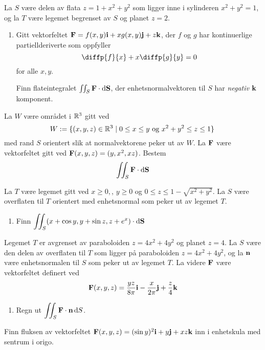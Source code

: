 \oppgave[K2015, Oppgave 7] La $S$ være delen av flata $z = 1 + x^2 + y^2$ som
ligger inne i sylinderen $x^2 + y^2 = 1$, og la $T$ være legemet begrenset av
$S$ og planet $z = 2$.

\begin{enumerate}
  \item Gitt vektorfeltet $\mathbf{F} = f(x,y) \mathbf{i} + x g(x,y) \mathbf{j} + z \mathbf{k}$, der $f$ og
    $g$ har kontinuerlige partiellderiverte som oppfyller
    \begin{equation*}
      \diffp{f}{x} + x \diffp{g}{y} = 0
    \end{equation*}
    for alle $x, y$.

    Finn flateintegralet $\iint_S \mathbf{F} \cdot \mathop{}\! \mathrm{d} \mathbf{S}\mathop{}\!$, der enhetsnormalvektoren
    til $S$ har \emph{negativ} $\mathbf{k}$ komponent.
\end{enumerate}

\oppgave[V2014, Oppgave 7] La $W$ være området i $\mathbb{R}^3$ gitt ved
%
\begin{equation*}
  W := \{ (x,y,z) \in \R^3 \mid 0 \leq x \leq y \ \text{og} \ x^2 + y^2 \leq z \leq 1 \}\,
\end{equation*}
%
med rand $S$ orientert slik at normalvektorene peker ut av $W$. La
$\mathbf{F}$ være vektorfeltet gitt ved $\mathbf{F}(x,y,z) = (y,x^2,xz)$. Bestem
%
\begin{equation*}
  \iint_{S} \mathbf{F} \cdot \mathop{}\! \mathrm{d} \mathbf{S}\mathop{}\!
\end{equation*}

\oppgave[K2013, Oppgave 7] La $T$ være legemet gitt ved $x \geq 0,$, $y \geq 0$
og $0 \leq z \leq 1 - \sqrt{x^2 + y^2}$. La $S$ være overflaten til $T$
orientert med enhetsnormal som peker ut av legemet $T$.

\begin{enumerate}
  \item Finn $\displaystyle \iint_S (x + \cos y, y + \sin z, z + e^x) \cdot \mathop{}\! \mathrm{d} \mathbf{S}\mathop{}\!$
\end{enumerate}

\oppgave[K2012, Oppgave 6] Legemet $T$ er avgrenset av paraboloiden $z = 4x^2 +
4y^2$ og planet $z = 4$. La $S$ være den delen av overflaten til $T$ som ligger
på paraboloiden $z = 4x^2 + 4y^2$, og la $\mathbf{n}$ være enhetsnormalen til $S$
som peker ut av legemet $T$. La videre $\mathbf{F}$ være vektorfeltet definert ved
%
\begin{equation*}
  \mathbf{F}(x,y,z)
  = \frac{yz}{8\pi} \mathbf{i} - \frac{x}{2\pi}\mathbf{j} + \frac{z}{4}\mathbf{k}
\end{equation*}
%
\begin{enumerate}
  \item Regn ut $\displaystyle \iint_S \mathbf{F} \cdot \mathbf{n} \mathop{}\! \mathrm{d} S\mathop{}\!$.
\end{enumerate}


\oppgave[V2012, Oppgave 5] Finn fluksen av vektorfeltet $\mathbf{F}(x,y,z) = (\sin
y)^2\mathbf{i} + y\mathbf{j} + xz\mathbf{k}$ inn i enhetskula med sentrum i origo. 


